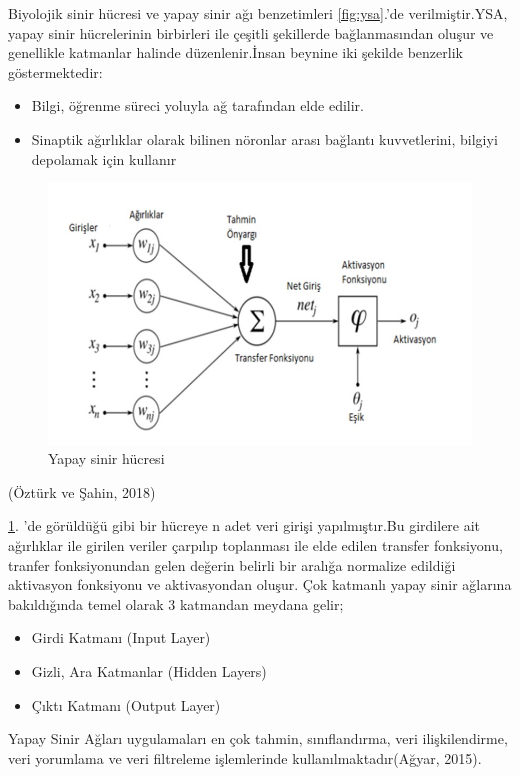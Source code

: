 \documentclass[12pt,twoside]{deuthesis}
\providecommand{\tightlist}{%
  \setlength{\itemsep}{0pt}\setlength{\parskip}{0pt}}
\begin{document}
Biyolojik sinir hücresi ve yapay sinir ağı benzetimleri \ref{fig:ysa}.'de verilmiştir.YSA, yapay sinir hücrelerinin birbirleri ile çeşitli şekillerde bağlanmasından oluşur ve genellikle katmanlar halinde düzenlenir.İnsan beynine iki şekilde benzerlik göstermektedir:
\begin{itemize}
\tightlist
\item
  Bilgi, öğrenme süreci yoluyla ağ tarafından elde edilir.
\item
  Sinaptik ağırlıklar olarak bilinen nöronlar arası bağlantı kuvvetlerini, bilgiyi depolamak için kullanır
\end{itemize}
\begin{figure}

{\centering \includegraphics[width=1\linewidth,height=0.27\textheight]{figure/ysa_2} 

}

\caption{Yapay sinir hücresi}\label{fig:ysa2}
\end{figure}
(Öztürk ve Şahin, 2018)

\ref{fig:ysa2}. 'de görüldüğü gibi bir hücreye n adet veri girişi yapılmıştır.Bu girdilere ait ağırlıklar ile girilen veriler çarpılıp toplanması ile elde edilen transfer fonksiyonu, tranfer fonksiyonundan gelen değerin belirli bir aralığa normalize edildiği aktivasyon fonksiyonu ve aktivasyondan oluşur.
Çok katmanlı yapay sinir ağlarına bakıldığında temel olarak 3 katmandan meydana gelir;
\begin{itemize}
\tightlist
\item
  Girdi Katmanı (Input Layer)
\item
  Gizli, Ara Katmanlar (Hidden Layers)
\item
  Çıktı Katmanı (Output Layer)
\end{itemize}
Yapay Sinir Ağları uygulamaları en çok tahmin, sınıflandırma, veri ilişkilendirme, veri yorumlama ve veri filtreleme işlemlerinde kullanılmaktadır(Ağyar, 2015).
\end{document}
